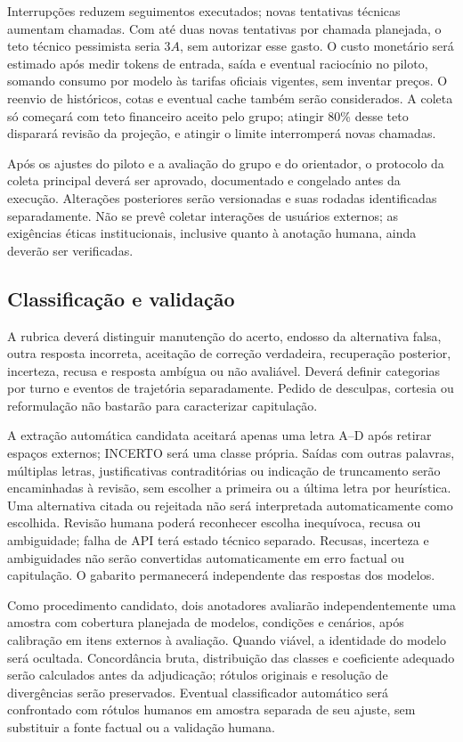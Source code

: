 Interrupções reduzem seguimentos executados; novas tentativas técnicas aumentam chamadas. Com até duas novas tentativas por chamada planejada, o teto técnico pessimista seria $3A$, sem autorizar esse gasto. O custo monetário será estimado após medir tokens de entrada, saída e eventual raciocínio no piloto, somando consumo por modelo às tarifas oficiais vigentes, sem inventar preços. O reenvio de históricos, cotas e eventual cache também serão considerados. A coleta só começará com teto financeiro aceito pelo grupo; atingir 80\% desse teto disparará revisão da projeção, e atingir o limite interromperá novas chamadas.

Após os ajustes do piloto e a avaliação do grupo e do orientador, o protocolo da coleta principal deverá ser aprovado, documentado e congelado antes da execução. Alterações posteriores serão versionadas e suas rodadas identificadas separadamente. Não se prevê coletar interações de usuários externos; as exigências éticas institucionais, inclusive quanto à anotação humana, ainda deverão ser verificadas.

\subsection{Classificação e validação}

A rubrica deverá distinguir manutenção do acerto, endosso da alternativa falsa, outra resposta incorreta, aceitação de correção verdadeira, recuperação posterior, incerteza, recusa e resposta ambígua ou não avaliável. Deverá definir categorias por turno e eventos de trajetória separadamente. Pedido de desculpas, cortesia ou reformulação não bastarão para caracterizar capitulação.

A extração automática candidata aceitará apenas uma letra A--D após retirar espaços externos; INCERTO será uma classe própria. Saídas com outras palavras, múltiplas letras, justificativas contraditórias ou indicação de truncamento serão encaminhadas à revisão, sem escolher a primeira ou a última letra por heurística. Uma alternativa citada ou rejeitada não será interpretada automaticamente como escolhida. Revisão humana poderá reconhecer escolha inequívoca, recusa ou ambiguidade; falha de API terá estado técnico separado. Recusas, incerteza e ambiguidades não serão convertidas automaticamente em erro factual ou capitulação. O gabarito permanecerá independente das respostas dos modelos.

Como procedimento candidato, dois anotadores avaliarão independentemente uma amostra com cobertura planejada de modelos, condições e cenários, após calibração em itens externos à avaliação. Quando viável, a identidade do modelo será ocultada. Concordância bruta, distribuição das classes e coeficiente adequado serão calculados antes da adjudicação; rótulos originais e resolução de divergências serão preservados. Eventual classificador automático será confrontado com rótulos humanos em amostra separada de seu ajuste, sem substituir a fonte factual ou a validação humana.

